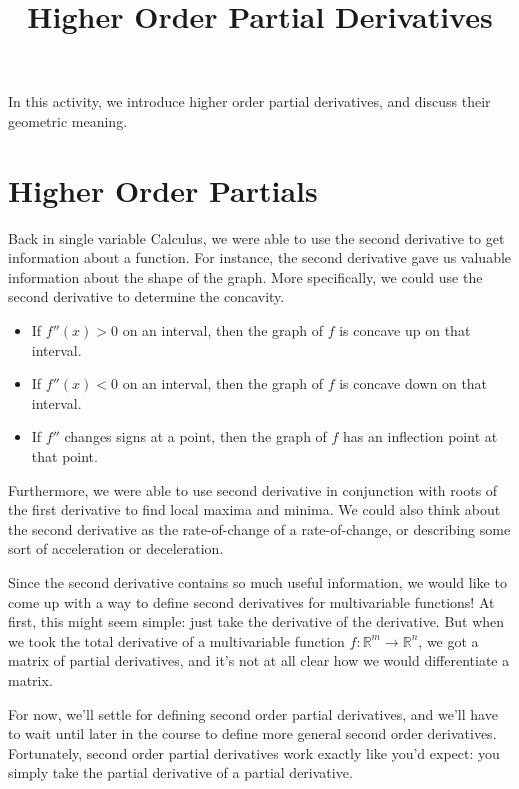 \documentclass{ximera}
\title{Higher Order Partial Derivatives}
\begin{document}
\begin{abstract}
\end{abstract}
\maketitle

In this activity, we introduce higher order partial derivatives, and discuss their geometric meaning.

\section*{Higher Order Partials}

Back in single variable Calculus, we were able to use the second derivative to get information about a function. For instance, the second derivative gave us valuable information about the shape of the graph. More specifically, we could use the second derivative to determine the concavity.
\begin{itemize}
\item If $f''(x)>0$ on an interval, then the graph of $f$ is concave up on that interval.
\item If $f''(x)<0$ on an interval, then the graph of $f$ is concave down on that interval.
\item If $f''$ changes signs at a point, then the graph of $f$ has an inflection point at that point.
\end{itemize}
Furthermore, we were able to use second derivative in conjunction with roots of the first derivative to find local maxima and minima. We could also think about the second derivative as the rate-of-change of a rate-of-change, or describing some sort of acceleration or deceleration.

Since the second derivative contains so much useful information, we would like to come up with a way to define second derivatives for multivariable functions! At first, this might seem simple: just take the derivative of the derivative. But when we took the total derivative of a multivariable function $f:\mathbb{R}^m\rightarrow\mathbb{R}^n$, we got a matrix of partial derivatives, and it's not at all clear how we would differentiate a matrix.

For now, we'll settle for defining second order partial derivatives, and we'll have to wait until later in the course to define more general second order derivatives. Fortunately, second order partial derivatives work exactly like you'd expect: you simply take the partial derivative of a partial derivative.
\end{document}
